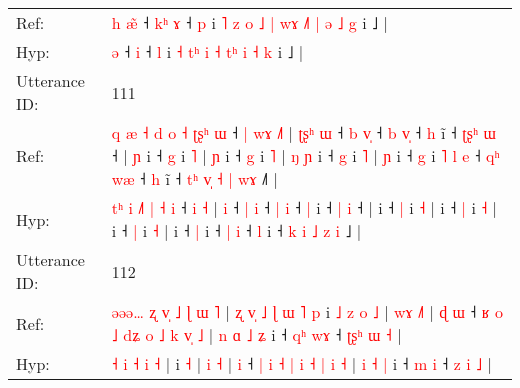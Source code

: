 \documentclass[10pt]{article}
\DeclareRobustCommand{\hl}[1]{{\textcolor{red}{#1}}}
\begin{document}
\begin{longtable}{ll}
Ref: & \hl{h}\hl{ }\hl{æ}\hl{̃} ˧\hl{ }\hl{k}\hl{ʰ} \hl{ɤ} ˧ \hl{p} i\hl{ }\hl{˥} \hl{z} \hl{o}\hl{ }\hl{˩} \hl{|} \hl{w}\hl{ɤ} \hl{˩}\hl{˥}\hl{ }\hl{|} \hl{ə} \hl{˩} \hl{g} i ˩ |
 \\
Hyp: & \hl{}\hl{}\hl{}\hl{ə} ˧\hl{}\hl{}\hl{} \hl{i} ˧ \hl{l} i\hl{}\hl{} \hl{˧} \hl{}\hl{t}\hl{ʰ} \hl{i} \hl{}\hl{˧} \hl{}\hl{}\hl{t}\hl{ʰ} \hl{i} \hl{˧} \hl{k} i ˩ |
 \\
\midrule
Utterance ID: & 111 \\
Ref: & \hl{q}\hl{ }\hl{æ} \hl{˧} \hl{d}\hl{ }\hl{o} \hl{˧} \hl{ʈ}\hl{ʂ}\hl{ʰ} \hl{ɯ} ˧\hl{ }\hl{|} \hl{w}\hl{ɤ} \hl{˩}\hl{˥} |\hl{ }\hl{ʈ}\hl{ʂ}\hl{ʰ} \hl{ɯ} ˧ \hl{b} \hl{v}\hl{̩} ˧ \hl{b} \hl{v}\hl{̩} ˧ \hl{h} i\hl{̃} ˧ \hl{ʈ}\hl{ʂ}\hl{ʰ} \hl{ɯ} ˧ |\hl{ }\hl{ɲ} i ˧ \hl{g} i \hl{˥} |\hl{ }\hl{ɲ} i ˧ \hl{g} i \hl{˥} |\hl{ }\hl{ŋ}\hl{ }\hl{ɲ} i ˧ \hl{g} i \hl{˥} |\hl{ }\hl{ɲ} i ˧ \hl{g} i\hl{ }\hl{˥}\hl{ }\hl{l}\hl{ }\hl{e} ˧ \hl{q}\hl{ʰ} \hl{w}\hl{æ} ˧ \hl{h} i\hl{̃} ˧ \hl{t}\hl{ʰ} \hl{v}\hl{̩} \hl{˧} \hl{|} \hl{w}\hl{ɤ} ˩\hl{˥} |
 \\
Hyp: & \hl{}\hl{t}\hl{ʰ} \hl{i} \hl{}\hl{˩}\hl{˥} \hl{|} \hl{}\hl{}\hl{˧} \hl{i} ˧\hl{}\hl{} \hl{}\hl{i} \hl{}\hl{˧} |\hl{}\hl{}\hl{}\hl{} \hl{i} ˧ \hl{|} \hl{}\hl{i} ˧ \hl{|} \hl{}\hl{i} ˧ \hl{|} i\hl{} ˧ \hl{}\hl{}\hl{|} \hl{i} ˧ |\hl{}\hl{} i ˧ \hl{|} i \hl{˧} |\hl{}\hl{} i ˧ \hl{|} i \hl{˧} |\hl{}\hl{}\hl{}\hl{} i ˧ \hl{|} i \hl{˧} |\hl{}\hl{} i ˧ \hl{|} i\hl{}\hl{}\hl{}\hl{}\hl{}\hl{} ˧ \hl{}\hl{|} \hl{}\hl{i} ˧ \hl{l} i\hl{} ˧ \hl{}\hl{k} \hl{}\hl{i} \hl{˩} \hl{z} \hl{}\hl{i} ˩\hl{} |
 \\
\midrule
Utterance ID: & 112 \\
Ref: & \hl{ə}\hl{ə}\hl{ə}\hl{…}\hl{ }\hl{ʐ}\hl{ }\hl{v}\hl{̩} \hl{˩} \hl{ɭ} \hl{ɯ} \hl{˥} |\hl{ }\hl{ʐ}\hl{ }\hl{v}\hl{̩}\hl{ }\hl{˩}\hl{ }\hl{ɭ}\hl{ }\hl{ɯ}\hl{ }\hl{˥}\hl{ }\hl{p} i\hl{ }\hl{˩}\hl{ }\hl{z}\hl{ }\hl{o} \hl{˩} | \hl{w}\hl{ɤ} \hl{˩}\hl{˥} |\hl{ }\hl{ɖ} \hl{ɯ} ˧ \hl{ʁ} \hl{o} \hl{˩} \hl{d}\hl{ʑ} \hl{o} \hl{˩} \hl{k} \hl{v}\hl{̩} \hl{˩} |\hl{ }\hl{n} \hl{ɑ} \hl{˩} \hl{ʑ} i ˧ \hl{q}\hl{ʰ} \hl{w}\hl{ɤ} ˧ \hl{ʈ}\hl{ʂ}\hl{ʰ} \hl{ɯ} \hl{˧} |
 \\
Hyp: & \hl{}\hl{}\hl{}\hl{}\hl{}\hl{}\hl{}\hl{}\hl{˧} \hl{i} \hl{˧} \hl{i} \hl{˧} |\hl{}\hl{}\hl{}\hl{}\hl{}\hl{}\hl{}\hl{}\hl{}\hl{}\hl{}\hl{}\hl{}\hl{}\hl{} i\hl{}\hl{}\hl{}\hl{}\hl{}\hl{} \hl{˧} | \hl{}\hl{i} \hl{}\hl{˧} |\hl{}\hl{} \hl{i} ˧ \hl{|} \hl{i} \hl{˧} \hl{}\hl{|} \hl{i} \hl{˧} \hl{|} \hl{}\hl{i} \hl{˧} |\hl{}\hl{} \hl{i} \hl{˧} \hl{|} i ˧ \hl{}\hl{m} \hl{}\hl{i} ˧ \hl{}\hl{}\hl{z} \hl{i} \hl{˩} |

\end{longtable}
\end{document}
